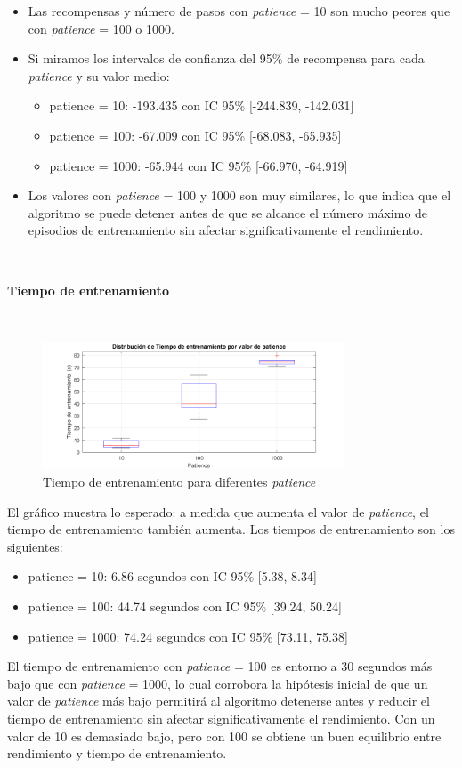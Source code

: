 \begin{itemize}
    \item Las recompensas y número de pasos con \textit{patience} = 10 son mucho peores que con \textit{patience} = 100 o 1000.
    \item Si miramos los intervalos de confianza del 95\% de recompensa para cada \textit{patience} y su valor medio:
    \begin{itemize}
        \item patience = 10: -193.435 con IC 95\% [-244.839, -142.031]
        \item patience = 100: -67.009 con IC 95\% [-68.083, -65.935]
        \item patience = 1000: -65.944 con IC 95\% [-66.970, -64.919]
    \end{itemize}
    \item Los valores con \textit{patience} = 100 y 1000 son muy similares, lo que indica que el algoritmo se puede detener antes de que se alcance el número máximo de episodios de entrenamiento sin afectar significativamente el rendimiento.
\end{itemize}

\

\textbf{Tiempo de entrenamiento}

\ 

\begin{figure}[H]
    \centering
    \includegraphics[width=0.8\textwidth]{../../experiments/directEstimation/experiment-3/results/time.png}
    \caption{Tiempo de entrenamiento para diferentes \textit{patience}}
    \label{fig:directEstimation3-time}
\end{figure}

El gráfico muestra lo esperado: a medida que aumenta el valor de \textit{patience}, el tiempo de entrenamiento también aumenta. Los tiempos de entrenamiento son los siguientes:
\begin{itemize}
    \item patience = 10: 6.86 segundos con IC 95\% [5.38, 8.34]
    \item patience = 100: 44.74 segundos con IC 95\% [39.24, 50.24]
    \item patience = 1000: 74.24 segundos con IC 95\% [73.11, 75.38]
\end{itemize}

El tiempo de entrenamiento con \textit{patience} = 100 es entorno a 30 segundos más bajo que con \textit{patience} = 1000, lo cual corrobora la hipótesis inicial de que un valor de \textit{patience} más bajo permitirá al algoritmo detenerse antes y reducir el tiempo de entrenamiento sin afectar significativamente el rendimiento. Con un valor de 10 es demasiado bajo, pero con 100 se obtiene un buen equilibrio entre rendimiento y tiempo de entrenamiento.
